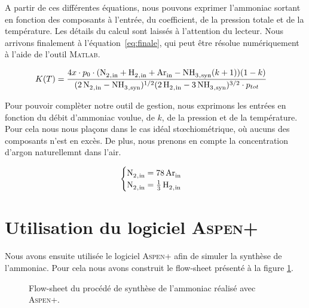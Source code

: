 A partir de ces différentes équations, nous pouvons exprimer l'ammoniac
sortant en fonction des composants à l'entrée, du coefficient, de la pression
totale et de la température. Les détails du calcul sont laissés à l'attention 
du lecteur. Nous arrivons finalement à l'équation~\eqref{eq:finale}, qui peut
être résolue numériquement à l'aide de l'outil \textsc{Matlab}.  

\begin{align}
	K(T) & = \frac{4x\cdot p_0\cdot (\ce{N2_{,in} + H2_{,in} + Ar_{in}} - 
	\ce{NH3_{,syn}}(k + 1)) (1 - k)}{(\ce{2N2_{,in} - NH3_{,syn}})^{1/2} (\ce{2H2_{,in} - 3NH3_{,syn}})^{3/2} \cdot p_{tot}}
	\label{eq:finale}
\end{align}

Pour pouvoir complèter notre outil de gestion, nous exprimons les entrées 
en fonction du débit d'ammoniac voulue, de $k$, de la pression et de la
température. Pour cela nous nous plaçons dans le cas idéal stœchiométrique,
où aucuns des composants n'est en excès. De plus, nous prenons en compte la 
concentration d'argon naturellemnt dans l'air. 
 
$$
\begin{cases}
 \ce{N2_{,in}} = \ce{78Ar_{in}}\\ 
 \ce{N2_{,in}} = \ce{1/3H2_{,in}} \\
\end{cases}
$$

\section{Utilisation du logiciel \textsc{Aspen+}}
Nous avons ensuite utilisée le logiciel \textsc{Aspen+}
afin de simuler la synthèse de l'ammoniac. Pour cela
nous avons construit le flow-sheet présenté à la figure
\ref{fig:flow-sheet-aspen}. 

\begin{figure}
	\centering
	\caption{Flow-sheet du procédé de synthèse de l'ammoniac
	réalisé avec \textsc{Aspen+}.}
	\label{fig:flow-sheet-aspen}
\end{figure}

